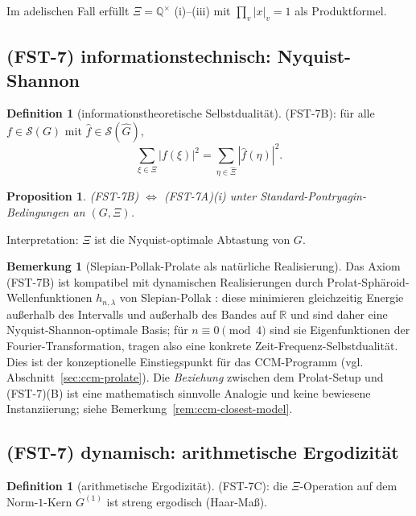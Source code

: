 \documentclass[11pt,a4paper]{article}
\theoremstyle{plain}
\newtheorem{proposition}[theorem]{Proposition}
\theoremstyle{definition}
\newtheorem{definition}[theorem]{Definition}
\newtheorem{remark}[theorem]{Bemerkung}
\newcommand{\R}{\mathbb{R}}
\newcommand{\Q}{\mathbb{Q}}
\renewcommand{\S}{\mathcal{S}}
\begin{document}
Im adelischen Fall erfüllt $\Xi = \Q^\times$ (i)--(iii) mit
$\prod_v |x|_v = 1$ als Produktformel.

\subsection{(FST-7) informationstechnisch: Nyquist-Shannon}

\begin{definition}[informationstheoretische Selbstdualität]
\label{def:fst7-b}
(FST-7B): für alle $f \in \S(G)$ mit $\hat f \in \S(\hat G)$,
\[
  \sum_{\xi \in \Xi} |f(\xi)|^2 = \sum_{\eta \in \hat\Xi}
    |\hat f(\eta)|^2.
\]
\end{definition}

\begin{proposition}
\label{prop:B-iff-A}
(FST-7B) $\Leftrightarrow$ (FST-7A)(i) unter Standard-Pontryagin-Bedingungen an $(G, \Xi)$.
\end{proposition}

Interpretation: $\Xi$ ist die Nyquist-optimale Abtastung von $G$.

\begin{remark}[Slepian-Pollak-Prolate als natürliche Realisierung]
\label{rem:b-view-prolate}
Das Axiom (FST-7B) ist kompatibel mit dynamischen Realisierungen durch
Prolat-Sphäroid-Wellenfunktionen $h_{n,\lambda}$ von Slepian-Pollak
\cite{SlepianPollack1961}: diese minimieren gleichzeitig
Energie außerhalb des Intervalls und außerhalb des Bandes auf $\R$ und sind
daher eine Nyquist-Shannon-optimale Basis; für $n \equiv 0 \pmod 4$ sind sie
Eigenfunktionen der Fourier-Transformation, tragen also eine konkrete
Zeit-Frequenz-Selbstdualität. Dies ist der konzeptionelle Einstiegspunkt
für das CCM-Programm (vgl. Abschnitt~\ref{sec:ccm-prolate}). Die
\emph{Beziehung} zwischen dem Prolat-Setup und (FST-7)(B) ist eine
mathematisch sinnvolle Analogie und keine bewiesene Instanziierung;
siehe Bemerkung~\ref{rem:ccm-closest-model}.
\end{remark}

\subsection{(FST-7) dynamisch: arithmetische Ergodizität}

\begin{definition}[arithmetische Ergodizität]
\label{def:fst7-c}
(FST-7C): die $\Xi$-Operation auf dem Norm-$1$-Kern $G^{(1)}$ ist streng
ergodisch (Haar-Maß).
\end{definition}
\end{document}

